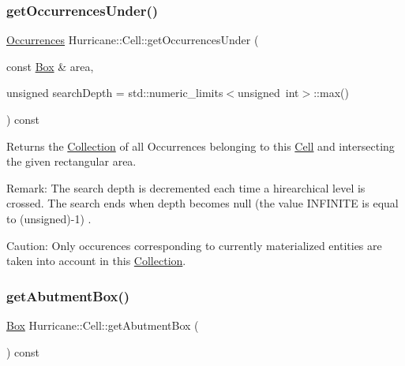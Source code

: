 \subsubsection{\texorpdfstring{get\+Occurrences\+Under()}{getOccurrencesUnder()}}
{\footnotesize\ttfamily \mbox{\hyperlink{namespaceHurricane_a1912927c128eee859af62dbe4cbe0a6b}{Occurrences}} Hurricane\+::\+Cell\+::get\+Occurrences\+Under (\begin{DoxyParamCaption}\item[{const \mbox{\hyperlink{classHurricane_1_1Box}{Box}} \&}]{area,  }\item[{unsigned}]{search\+Depth = {\ttfamily std\+:\+:numeric\+\_\+limits$<$unsigned~int$>$\+:\+:max()} }\end{DoxyParamCaption}) const}

Returns the \mbox{\hyperlink{classHurricane_1_1Collection}{Collection}} of all Occurrences belonging to this \mbox{\hyperlink{classHurricane_1_1Cell}{Cell}} and intersecting the given rectangular area.

\begin{DoxyParagraph}{Remark\+: The search depth is decremented each time a hirearchical}
level is crossed. The search ends when depth becomes null (the value {\ttfamily I\+N\+F\+I\+N\+I\+TE} is equal to {\ttfamily }(unsigned)-\/1) .
\end{DoxyParagraph}
\begin{DoxyParagraph}{Caution\+: Only occurences corresponding to currently materialized}
entities are taken into account in this \mbox{\hyperlink{classHurricane_1_1Collection}{Collection}}. 
\end{DoxyParagraph}
\mbox{\label{classHurricane_1_1Cell_a142360ca7b3c1c637894f5b9a2cac069}} 
\subsubsection{\texorpdfstring{get\+Abutment\+Box()}{getAbutmentBox()}}
{\footnotesize\ttfamily \mbox{\hyperlink{classHurricane_1_1Box}{Box}} Hurricane\+::\+Cell\+::get\+Abutment\+Box (\begin{DoxyParamCaption}{ }\end{DoxyParamCaption}) const\hspace{0.3cm}{\ttfamily [inline]}}

